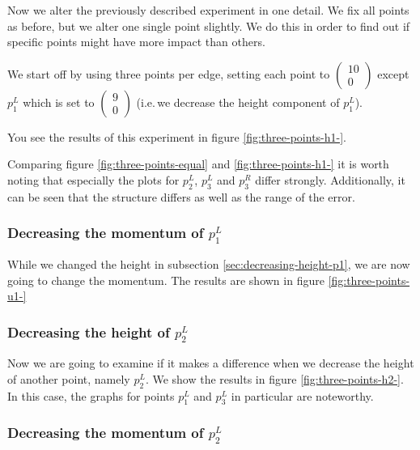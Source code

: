 \documentclass{article}
\begin{document}
Now we alter the previously described experiment in one detail. We fix all points as before, but we alter one single point slightly. We do this in order to find out if specific points might have more impact than others.

We start off by using three points per edge, setting each point to $
\begin{pmatrix}
  10 \\ 0
\end{pmatrix}$ except $p_1^L$ which is set to $
\begin{pmatrix}
  9 \\ 0
\end{pmatrix}
$ (i.e.\,we decrease the height component of $p_1^L$).



You see the results of this experiment in figure \ref{fig:three-points-h1-}. 

Comparing figure \ref{fig:three-points-equal} and \ref{fig:three-points-h1-} it is worth noting that especially the plots for $p_2^L$, $p_3^L$ and $p_3^R$ differ strongly. Additionally, it can be seen that the structure differs as well as the range of the error.

\subsubsection{Decreasing the momentum of $p_1^L$}
\label{sec:decreasing-momentum-p1}

While we changed the height in subsection \ref{sec:decreasing-height-p1}, we are now going to change the momentum. The results are shown in figure \ref{fig:three-points-u1-}



\subsubsection{Decreasing the height of $p_2^L$}
\label{sec:decreasing-height-p2}

Now we are going to examine if it makes a difference when we decrease the height of another point, namely $p_2^L$. We show the results in figure \ref{fig:three-points-h2-}. In this case, the graphs for points $p_1^L$ and $p_3^L$ in particular are noteworthy.



\subsubsection{Decreasing the momentum of $p_2^L$}
\label{sec:decreasing-momentum-of-p2}
\end{document}
